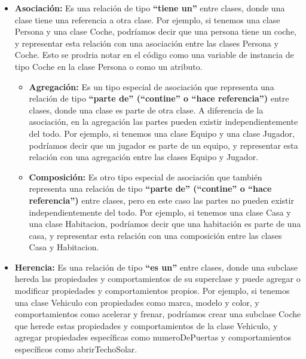 \documentclass[../main.tex]{subfiles}
\begin{document}
        \newpage
        \begin{itemize}
            \item \textbf{Asociación:} Es una relación de tipo \textbf{“tiene un”} entre clases, donde una clase tiene una referencia a otra clase. Por ejemplo, si tenemos una clase Persona y una clase Coche, podríamos decir que una persona tiene un coche, y representar esta relación con una asociación entre las clases Persona y Coche. Esto se prodria notar en el código como una variable de instancia de tipo Coche en la clase Persona o como un atributo.
                \begin{itemize}
                    \item \textbf{Agregación:} Es un tipo especial de asociación que representa una relación de tipo \textbf{“parte de” (“contine” o “hace referencia”)} entre clases, donde una clase es parte de otra clase. A diferencia de la asociación, en la agregación las partes pueden existir independientemente del todo. Por ejemplo, si tenemos una clase Equipo y una clase Jugador, podríamos decir que un jugador es parte de un equipo, y representar esta relación con una agregación entre las clases Equipo y Jugador.
                        
                    \item \textbf{Composición:} Es otro tipo especial de asociación que también representa una relación de tipo \textbf{“parte de” (“contine” o “hace referencia”)} entre clases, pero en este caso las partes no pueden existir independientemente del todo. Por ejemplo, si tenemos una clase Casa y una clase Habitacion, podríamos decir que una habitación es parte de una casa, y representar esta relación con una composición entre las clases Casa y Habitacion.
                            
                \end{itemize}
            \item \textbf{Herencia:} Es una relación de tipo \textbf{“es un”} entre clases, donde una subclase hereda las propiedades y comportamientos de su superclase y puede agregar o modificar propiedades y comportamientos propios. Por ejemplo, si tenemos una clase Vehiculo con propiedades como marca, modelo y color, y comportamientos como acelerar y frenar, podríamos crear una subclase Coche que herede estas propiedades y comportamientos de la clase Vehiculo, y agregar propiedades específicas como numeroDePuertas y comportamientos específicos como abrirTechoSolar.
            

\end{itemize}
\end{document}
